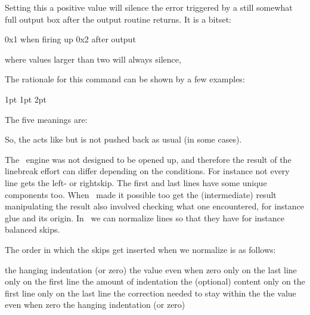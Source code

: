 Setting this a positive value will silence the error triggered by a still
somewhat full output box after the output routine returns. It is a bitset:

\starttabulate[|T||]
\NC 0x1 \NC when firing up \NC \NR
\NC 0x2 \NC after output   \NC \NR
\stoptabulate

where values larger than two will always silence,

\stopnewprimitive

\startnewprimitive[title={\prm {norelax}}]

The rationale for this command can be shown by a few examples:

\startbuffer
{} 1pt  1pt  2pt
\edef\testa{\ifdim\dimen0=\dimen2\norelax N\else Y\fi}
\edef\testb{\ifdim\dimen0=\dimen2\relax   N\else Y\fi}
\edef\testc{\ifdim\dimen0=\dimen4\norelax N\else Y\fi}
\edef\testd{\ifdim\dimen0=\dimen4\relax   N\else Y\fi}
\edef\teste{\norelax}
\stopbuffer

\typebuffer

The five meanings are:

\start \getbuffer \starttabulate[|T|T|]
\NC \string\testa \NC \meaning\testa \NC \NR
\NC \string\testb \NC \meaning\testb \NC \NR
\NC \string\testc \NC \meaning\testc \NC \NR
\NC \string\testd \NC \meaning\testd \NC \NR
\NC \string\teste \NC \meaning\teste \NC \NR
\stoptabulate \stop

So, the  acts like  but is not pushed back as
usual (in some cases).

\stopnewprimitive

\startnewprimitive[title={\prm {normalizelinemode}}]

The \TEX\ engine was not designed to be opened up, and therefore the result of
the linebreak effort can differ depending on the conditions. For instance not
every line gets the left- or rightskip. The first and last lines have some unique
components too. When \LUATEX\ made it possible too get the (intermediate) result
manipulating the result also involved checking what one encountered, for instance
glue and its origin. In \LUAMETATEX\ we can normalize lines so that they have for
instance balanced skips.

\starttworows
{}
\stoptworows

The order in which the skips get inserted when we normalize is as follows:

\starttabulate
\NC {}     \NC the hanging indentation (or zero) \NC \NR
\NC {}         \NC the value even when zero \NC \NR
\NC {}  \NC only on the last line \NC \NR
\NC {}  \NC only on the first line \NC \NR
\NC {}       \NC the amount of indentation \NC \NR
\NC \unknown                \NC the (optional) content \NC \NR
\NC {} \NC only on the first line \NC \NR
\NC {} \NC only on the last line \NC \NR
\NC {}   \NC the correction needed to stay within the  \NC \NR
\NC {}        \NC the value even when zero \NC \NR
\NC {}    \NC the hanging indentation (or zero) \NC \NR
\stoptabulate

